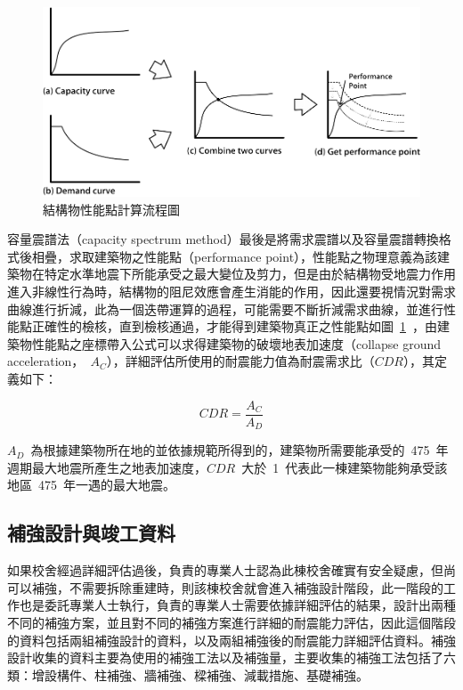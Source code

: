 \begin{figure}[hbtp]
  \begin{center}
    \includegraphics[width=1.0\textwidth]{figures/performance-point.png}
    \caption{結構物性能點計算流程圖}
    \label{fig:performance-point}
  \end{center}
\end{figure}

容量震譜法（capacity spectrum method）最後是將需求震譜以及容量震譜轉換格式後相疊，求取建築物之性能點（performance point），性能點之物理意義為該建築物在特定水準地震下所能承受之最大變位及剪力，但是由於結構物受地震力作用進入非線性行為時，結構物的阻尼效應會產生消能的作用，因此還要視情況對需求曲線進行折減，此為一個迭帶運算的過程，可能需要不斷折減需求曲線，並進行性能點正確性的檢核，直到檢核通過，才能得到建築物真正之性能點如圖~\ref{fig:performance-point}~，由建築物性能點之座標帶入公式可以求得建築物的破壞地表加速度（collapse ground acceleration，~$A_C$），詳細評估所使用的耐震能力值為耐震需求比（$CDR$），其定義如下：

\begin{equation} CDR = \dfrac{A_C}{A_D} \label{eq:CDR}\end{equation} 

$A_D$~為根據建築物所在地的並依據規範所得到的，建築物所需要能承受的~475~年週期最大地震所產生之地表加速度，$CDR$~大於~1~代表此一棟建築物能夠承受該地區~475~年一遇的最大地震。

\subsection{補強設計與竣工資料}

如果校舍經過詳細評估過後，負責的專業人士認為此棟校舍確實有安全疑慮，但尚可以補強，不需要拆除重建時，則該棟校舍就會進入補強設計階段，此一階段的工作也是委託專業人士執行，負責的專業人士需要依據詳細評估的結果，設計出兩種不同的補強方案，並且對不同的補強方案進行詳細的耐震能力評估，因此這個階段的資料包括兩組補強設計的資料，以及兩組補強後的耐震能力詳細評估資料。補強設計收集的資料主要為使用的補強工法以及補強量，主要收集的補強工法包括了六類：增設構件、柱補強、牆補強、樑補強、減載措施、基礎補強。

